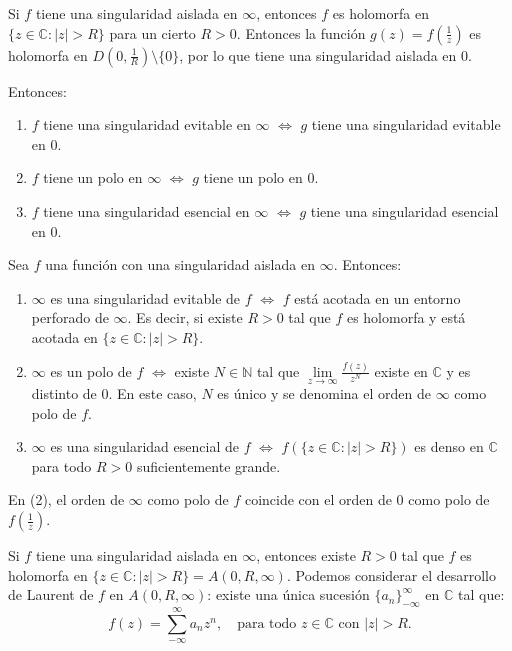 Si $f$ tiene una singularidad aislada en $\infty$, entonces $f$ es holomorfa en $\{z \in \mathbb{C} : |z| > R\}$ para un cierto $R > 0$.
Entonces la función $g(z) = f\left(\frac{1}{z}\right)$ es holomorfa en $D\left(0, \frac{1}{R}\right) \setminus \{0\}$, por lo que tiene una singularidad aislada en 0.

Entonces:
\begin{enumerate}
    \item $f$ tiene una singularidad evitable en $\infty$ $\Leftrightarrow$ $g$ tiene una singularidad evitable en 0.
    \item $f$ tiene un polo en $\infty$ $\Leftrightarrow$ $g$ tiene un polo en 0.
    \item $f$ tiene una singularidad esencial en $\infty$ $\Leftrightarrow$ $g$ tiene una singularidad esencial en 0.
\end{enumerate}

\begin{proposition}
    Sea $f$ una función con una singularidad aislada en $\infty$.
    Entonces:
    \begin{enumerate}
        \item $\infty$ es una singularidad evitable de $f$ $\Leftrightarrow$ $f$ está acotada en un entorno perforado de $\infty$.
              Es decir, si existe $R > 0$ tal que $f$ es holomorfa y está acotada en $\{z \in \mathbb{C} : |z| > R\}$.
        \item $\infty$ es un polo de $f$ $\Leftrightarrow$ existe $N \in \mathbb{N}$ tal que $\lim\limits_{z \to \infty} \frac{f(z)}{z^N}$ existe en $\mathbb{C}$ y es distinto de 0.
              En este caso, $N$ es único y se denomina el orden de $\infty$ como polo de $f$.
        \item $\infty$ es una singularidad esencial de $f$ $\Leftrightarrow$ $f(\{z \in \mathbb{C} : |z| > R\})$ es denso en $\mathbb{C}$ para todo $R > 0$ suficientemente grande.
    \end{enumerate}
\end{proposition}

\begin{remark}
    En (2), el orden de $\infty$ como polo de $f$ coincide con el orden de 0 como polo de $f\left(\frac{1}{z}\right)$.
\end{remark}

Si $f$ tiene una singularidad aislada en $\infty$, entonces existe $R > 0$ tal que $f$ es holomorfa en $\{z \in \mathbb{C} : |z| > R\} = A(0, R, \infty)$.
Podemos considerar el desarrollo de Laurent de $f$ en $A(0, R, \infty)$: existe una única sucesión $\{a_n\}_{-\infty}^\infty$ en $\mathbb{C}$ tal que:
$$f(z) = \sum_{-\infty}^\infty a_nz^n, \quad \text{para todo } z \in \mathbb{C} \text{ con } |z| > R.$$

